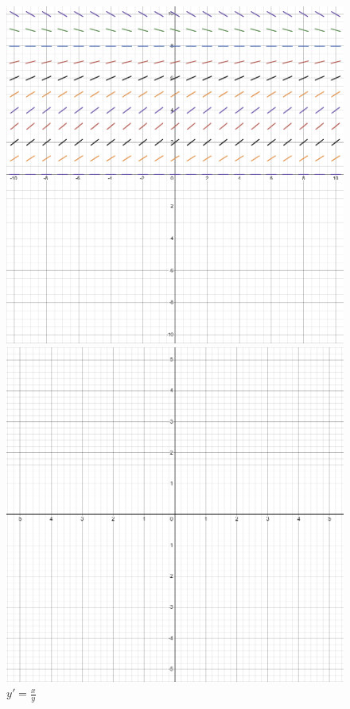 \documentclass[11pt]{article}
\begin{document}
    \begin{figure}[h]
        \begin{minipage}[c]{0.48\linewidth}
            \includegraphics[width=\linewidth]{F24/Misc. Notes/Population curve.png}
            \caption{$\frac{dP}{dt}=kP\left(1-\frac{P}{M}\right)$}
            \end{minipage}
            \hfill
            \begin{minipage}[c]{0.48\linewidth}
            \includegraphics[width=\linewidth]{F24/Misc. Notes/Blank.png}
            \caption{$y'=\frac{x}{y}$}
        \end{minipage}%
    \end{figure}
        
\end{document}
